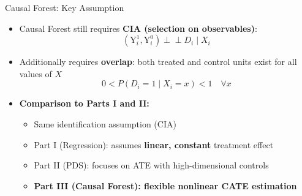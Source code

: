 \documentclass[hyperref={pdfpagelabels=false}]{beamer}
\newcommand{\indep}{\perp\!\!\!\perp}
\begin{document}
\begin{frame}{Causal Forest: Key Assumption}
	\begin{itemize}
		\item Causal Forest still requires \textbf{CIA (selection on observables)}:
		\begin{equation*}
			(\mathrm{Y}^{1}_{i}, \mathrm{Y}^{0}_{i}) \indep D_{i} \mid X_{i}
		\end{equation*}
		\vspace{0.2cm}
		\item Additionally requires \textbf{overlap}: both treated and control units exist for all values of $X$
		\begin{equation*}
			0 < P(D_i = 1 \mid X_i = x) < 1 \quad \forall x
		\end{equation*}
		\vspace{0.3cm}
		\item \textbf{Comparison to Parts I and II:}
		\vspace{0.2cm}
		\begin{itemize}
			\item Same identification assumption (CIA)
			\vspace{0.2cm}
			\item Part I (Regression): assumes \textbf{linear, constant} treatment effect
			\vspace{0.2cm}
			\item Part II (PDS): focuses on ATE with high-dimensional controls
			\vspace{0.2cm}
			\item \textbf{Part III (Causal Forest): flexible nonlinear CATE estimation}
		\end{itemize}
	\end{itemize}
\end{frame}
\end{document}

